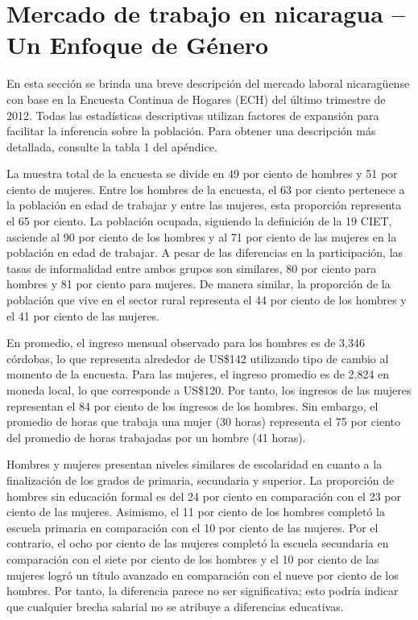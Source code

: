 \section{Mercado de trabajo en nicaragua -- Un Enfoque de Género}
En esta sección se brinda una breve descripción del mercado laboral nicaragüense con base en la Encuesta Continua de Hogares (ECH) del último trimestre de 2012. Todas las estadísticas descriptivas utilizan factores de expansión para facilitar la inferencia sobre la población. Para obtener una descripción más detallada, consulte la tabla 1 del apéndice.

La muestra total de la encuesta se divide en 49 por ciento de hombres y 51 por ciento de mujeres. Entre los hombres de la encuesta, el 63 por ciento pertenece a la población en edad de trabajar y entre las mujeres, esta proporción representa el 65 por ciento. La población ocupada, siguiendo la definición de la 19 CIET, asciende al 90 por ciento de los hombres y al 71 por ciento de las mujeres en la población en edad de trabajar. A pesar de las diferencias en la participación, las tasas de informalidad entre ambos grupos son similares, 80 por ciento para hombres y 81 por ciento para mujeres. De manera similar, la proporción de la población que vive en el sector rural representa el 44 por ciento de los hombres y el 41 por ciento de las mujeres.

En promedio, el ingreso mensual observado para los hombres es de 3,346 córdobas, lo que representa alrededor de US\$142 utilizando tipo de cambio al momento de la encuesta. Para las mujeres, el ingreso promedio es de 2,824 en moneda local, lo que corresponde a US\$120. Por tanto, los ingresos de las mujeres representan el 84 por ciento de los ingresos de los hombres. Sin embargo, el promedio de horas que trabaja una mujer (30 horas) representa el 75 por ciento del promedio de horas trabajadas por un hombre (41 horas).

Hombres y mujeres presentan niveles similares de escolaridad en cuanto a la finalización de los grados de primaria, secundaria y superior. La proporción de hombres sin educación formal es del 24 por ciento en comparación con el 23 por ciento de las mujeres. Asimismo, el 11 por ciento de los hombres completó la escuela primaria en comparación con el 10 por ciento de las mujeres. Por el contrario, el ocho por ciento de las mujeres completó la escuela secundaria en comparación con el siete por ciento de los hombres y el 10 por ciento de las mujeres logró un título avanzado en comparación con el nueve por ciento de los hombres. Por tanto, la diferencia parece no ser significativa; esto podría indicar que cualquier brecha salarial no se atribuye a diferencias educativas.

